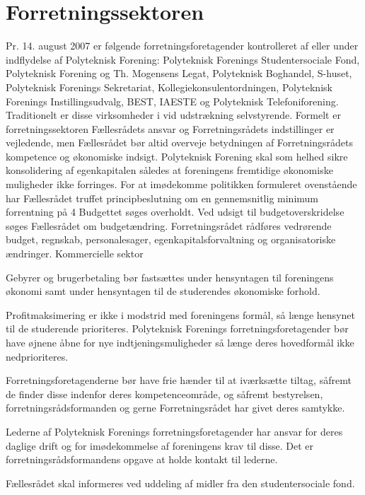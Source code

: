\section{Forretningssektoren}
Pr. 14. august 2007 er følgende forretningsforetagender kontrolleret af eller under indflydelse af Polyteknisk Forening:
Polyteknisk Forenings Studentersociale Fond, Polyteknisk Forening og Th. Mogensens Legat, Polyteknisk Boghandel,
S-huset, Polyteknisk Forenings Sekretariat, Kollegiekonsulentordningen, Polyteknisk Forenings Instillingsudvalg,
BEST, IAESTE og Polyteknisk Telefoniforening.
Traditionelt er disse virksomheder i vid udstrækning selvstyrende. Formelt er forretningssektoren Fællesrådets ansvar
og Forretningsrådets indstillinger er vejledende, men Fællesrådet bør altid overveje betydningen af Forretningsrådets
kompetence og økonomiske indsigt.
Polyteknisk Forening skal som helhed sikre konsolidering af egenkapitalen således at foreningens fremtidige
økonomiske muligheder ikke forringes.
For at imødekomme politikken formuleret ovenstående har Fællesrådet truffet principbeslutning om en gennemsnitlig
minimum forrentning på 4%
Budgettet søges overholdt. Ved udsigt til budgetoverskridelse søges Fællesrådet om budgetændring.
Forretningsrådet rådføres vedrørende budget, regnskab, personalesager, egenkapitalsforvaltning og organisatoriske
ændringer.
Kommercielle sektor
\begin{list}{•}
\item Gebyrer og brugerbetaling bør fastsættes under hensyntagen til foreningens økonomi samt under hensyntagen
til de studerendes økonomiske forhold.
\item Profitmaksimering er ikke i modstrid med foreningens formål, så længe hensynet til de studerende prioriteres.
Polyteknisk Forenings forretningsforetagender bør have øjnene åbne for nye indtjeningsmuligheder så længe
deres hovedformål ikke nedprioriteres.
\item Forretningsforetagenderne bør have frie hænder til at iværksætte tiltag, såfremt de finder disse indenfor deres
kompetenceområde, og såfremt bestyrelsen, forretningsrådsformanden og gerne Forretningsrådet har givet
deres samtykke.
\item Lederne af Polyteknisk Forenings forretningsforetagender har ansvar for deres daglige drift og for
imødekommelse af foreningens krav til disse. Det er forretningsrådsformandens opgave at holde kontakt til
lederne.
\item Fællesrådet skal informeres ved uddeling af midler fra den studentersociale fond.
\end{list}


